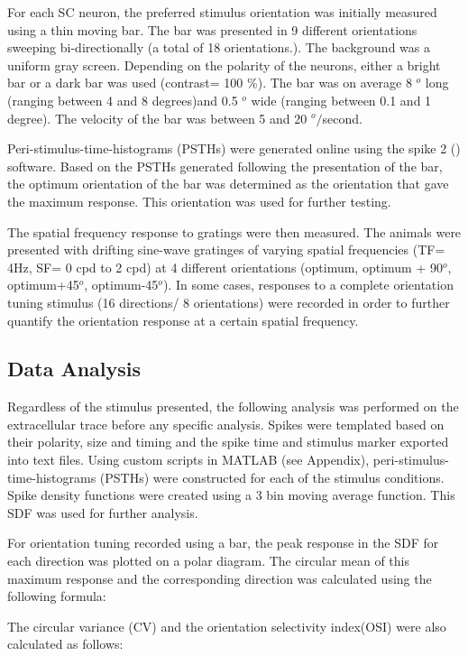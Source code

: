 	For each SC neuron, the preferred stimulus orientation was initially measured using a thin moving bar. The bar was presented in 9 different orientations sweeping bi-directionally (a total of 18 orientations.). The background was a uniform gray screen. Depending on the polarity of the neurons, either a bright bar or a dark bar was used (contrast= 100 \%). The bar was on average 8 $^{o}$ long (ranging between 4 and 8 degrees)and 0.5 $^{o}$ wide (ranging between 0.1 and 1 degree). The velocity of the bar was between 5 and 20 $^{o}/$second. 
	
	Peri-stimulus-time-histograms (PSTHs) were generated online using the spike 2 () software. Based on the PSTHs generated following the presentation of the bar, the optimum orientation of the bar was determined as the orientation that gave the maximum response. This orientation was used for further testing.
	
	The spatial frequency response to gratings were then measured. The animals were presented with drifting sine-wave gratinges of varying spatial frequencies (TF= 4Hz, SF= 0 cpd to 2 cpd) at 4 different orientations (optimum, optimum + 90$^{o}$, optimum+45$^{o}$, optimum-45$^{o}$). In some cases, responses to a complete orientation tuning stimulus (16 directions/ 8 orientations) were recorded in order to further quantify the orientation response at a certain spatial frequency.
	
	\subsection{Data Analysis}
	
	Regardless of the stimulus presented, the following analysis was performed on the extracellular trace before any specific analysis. Spikes were templated based on their polarity, size and timing and the spike time and stimulus marker exported into text files. Using custom scripts in MATLAB (see Appendix), peri-stimulus-time-histograms (PSTHs) were constructed for each of the stimulus conditions. Spike density functions were created using a 3 bin moving average function. This SDF was used for further analysis.
	
	For orientation tuning recorded using a bar, the peak response in the SDF for each direction was plotted on a polar diagram. The circular mean of this maximum response and the corresponding direction was calculated using the following formula:
		
	 The circular variance (CV) and the orientation selectivity index(OSI) were also calculated as follows:
	 
